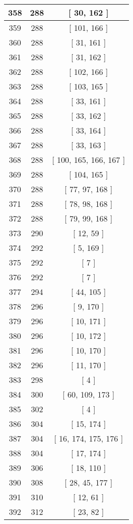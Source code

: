 \begin{center}
\begin{longtable}[H]{|| c c c ||}
\hline
358 & 288 & [ 30, 162 ] \\ 
\hline
359 & 288 & [ 101, 166 ] \\ 
\hline
360 & 288 & [ 31, 161 ] \\ 
\hline
361 & 288 & [ 31, 162 ] \\ 
\hline
362 & 288 & [ 102, 166 ] \\ 
\hline
363 & 288 & [ 103, 165 ] \\ 
\hline
364 & 288 & [ 33, 161 ] \\ 
\hline
365 & 288 & [ 33, 162 ] \\ 
\hline
366 & 288 & [ 33, 164 ] \\ 
\hline
367 & 288 & [ 33, 163 ] \\ 
\hline
368 & 288 & [ 100, 165, 166, 167 ] \\ 
\hline
369 & 288 & [ 104, 165 ] \\ 
\hline
370 & 288 & [ 77, 97, 168 ] \\ 
\hline
371 & 288 & [ 78, 98, 168 ] \\ 
\hline
372 & 288 & [ 79, 99, 168 ] \\ 
\hline
373 & 290 & [ 12, 59 ] \\ 
\hline
374 & 292 & [ 5, 169 ] \\ 
\hline
375 & 292 & [ 7 ] \\ 
\hline
376 & 292 & [ 7 ] \\ 
\hline
377 & 294 & [ 44, 105 ] \\ 
\hline
378 & 296 & [ 9, 170 ] \\ 
\hline
379 & 296 & [ 10, 171 ] \\ 
\hline
380 & 296 & [ 10, 172 ] \\ 
\hline
381 & 296 & [ 10, 170 ] \\ 
\hline
382 & 296 & [ 11, 170 ] \\ 
\hline
383 & 298 & [ 4 ] \\ 
\hline
384 & 300 & [ 60, 109, 173 ] \\ 
\hline
385 & 302 & [ 4 ] \\ 
\hline
386 & 304 & [ 15, 174 ] \\ 
\hline
387 & 304 & [ 16, 174, 175, 176 ] \\ 
\hline
388 & 304 & [ 17, 174 ] \\ 
\hline
389 & 306 & [ 18, 110 ] \\ 
\hline
390 & 308 & [ 28, 45, 177 ] \\ 
\hline
391 & 310 & [ 12, 61 ] \\ 
\hline
392 & 312 & [ 23, 82 ] \\ 

\end{longtable}
\end{center}
